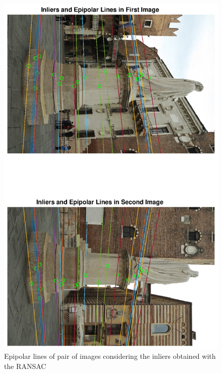 \documentclass[12pt]{article}
\begin{document}
\begin{figure}[H]
    \hspace*{-11cm}
    \includegraphics[scale=0.75]{images/epipolar3.eps}
    \caption{Epipolar lines of pair of images considering the inliers obtained with the RANSAC}
    \label{fig:epipolar2}
\end{figure}
\end{document}
